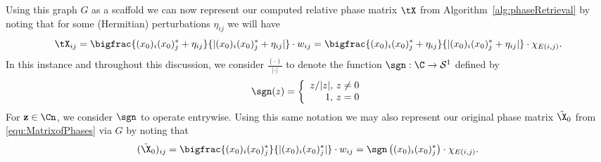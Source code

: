 Using this graph $G$ as a scaffold we can now represent our computed relative phase matrix $\tX$ from Algorithm~\ref{alg:phaseRetrieval} by noting that for some (Hermitian) perturbations $\eta_{ij}$ 
we will have 
\begin{equation}
\tX_{ij} = \bigfrac{(x_0)_i(x_0)_j^* + \eta_{ij}}{|(x_0)_i(x_0)_j^* + \eta_{ij}|} \cdot w_{ij} = \bigfrac{(x_0)_i(x_0)_j^* + \eta_{ij}}{|(x_0)_i(x_0)_j^* + \eta_{ij}|} \cdot \chi_{E(i, j)}.
\label{equ:DeftildeXviaGcomp}
\end{equation}
In this instance and throughout this discussion, we consider $\frac{(\cdot)}{|\cdot|}$ to denote the function $\sgn : \C \to \mathcal{S}^1$ defined by \[\sgn(z) = \left\{\begin{array}{r@{,\ }l} z / |z| & z \neq 0 \\ 1 & z = 0\end{array}\right.\]  For ${\bf z} \in \Cn$, we consider $\sgn$ to operate entrywise.  Using this same notation we may also represent our original phase matrix $\tilde{\X}_0$ from 
\eqref{equ:MatrixofPhases} via $G$ by noting that
\begin{equation}
(\tilde{\X}_0)_{ij} = \bigfrac{(x_0)_i(x_0)_j^*}{|(x_0)_i(x_0)_j^*|} \cdot w_{ij} = \sgn \left( (x_0)_i(x_0)_j^* \right) \cdot \chi_{E(i, j)}.
\label{equ:DeftildeXviaGpure}
\end{equation}


